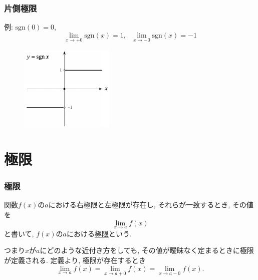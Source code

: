 

\begin{frame}
\frametitle{片側極限}


例: $\mathrm{sgn}(0)=0$, 
$$
\lim_{x \to +0}\mathrm{sgn}(x)=1, \ \ \ \lim_{x \to -0}\mathrm{sgn}(x)=-1
$$

\vspace{-3mm}

 \begin{figure}[htbp]
 \begin{center} 
  \includegraphics[width=45mm]{calculus3/sgn.png}
 \end{center}
\end{figure}

\vspace{-3mm}

\end{frame}





\section{極限}

\begin{frame}
\frametitle{極限} 


\begin{Def}
関数$f(x)$の$a$における右極限と左極限が存在し, それらが一致するとき, その値を
$$
\lim_{x\to a} f(x)
$$
と書いて, $f(x)$の$a$における\underline{極限}という. 
\end{Def}

つまり$x$が$a$にどのような近付き方をしても, その値が曖昧なく定まるときに極限が定義される. 
定義より, 極限が存在するとき
$$
\lim_{x\to a} f(x) = \lim_{x\to a+0} f(x) = \lim_{x\to a-0} f(x). 
$$

\end{frame}


